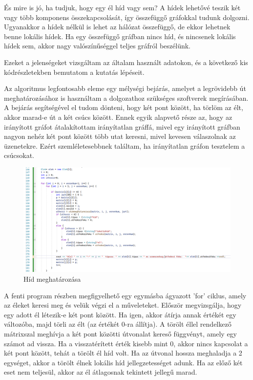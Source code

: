 És mire is jó, ha tudjuk, hogy egy él híd vagy sem? A hídek lehetővé teszik két vagy több komponens összekapcsolását, így összefüggő gráfokkal tudunk dolgozni. Ugyanakkor a hídek nélkül is lehet az hálózat összefüggő, de ekkor lehetnek benne lokális hídek. Ha egy összefüggő gráfban nincs híd, és nincsenek lokális hídek sem, akkor nagy valószínűséggel teljes gráfról beszélünk.

Ezeket a jelenségeket vizsgáltam az általam használt adatokon, és a következő kis kódrészletekben bemutatom a kutatás lépéseit.

Az algoritmus legfontosabb eleme egy mélységi bejárás, amelyet a legrövidebb út meghatározásához is használtam a dolgozathoz szükséges szoftverek megírásában. A bejárás segítségével el tudom dönteni, hogy két pont között, ha törlöm az élt, akkor marad-e út a két csúcs között. Ennek egyik alapvető része az, hogy az irányított gráfot átalakítottam irányítatlan gráffá, mivel egy irányított gráfban nagyon nehéz két pont között több utat keresni, mivel kevesen válaszolnak az üzenetekre. Ezért szemléletesebbnek találtam, ha irányítatlan gráfon tesztelem a csúcsokat.

\begin{figure}[h]
    \centering
    \includegraphics[scale=0.5]{images/hidprogram}
    \caption{Híd meghatározása}
    \label{fig:enter-label}
\end{figure}
 A fenti program részben megfigyelhető egy egymásba ágyazott 'for' ciklus, amely az éleket keresi meg és velük végzi el a műveleteket. Először megvizsgálja, hogy egy adott él létezik-e két pont között. Ha igen, akkor átírja annak értékét egy változóba, majd törli az élt (az értékét 0-ra állítja). A törölt éllel rendelkező mátrixszal meghívja a két pont közötti útvonalat kereső függvényt, amely egy számot ad vissza. Ha a visszatérített érték kisebb mint 0, akkor nincs kapcsolat a két pont között, tehát a törölt él híd volt. Ha az útvonal hossza meghaladja a 2 egységet, akkor a törölt élnek lokális híd jellegzetességet adunk. Ha az előző két eset nem teljesül, akkor az él átlagosnak tekintett jellegű marad.

